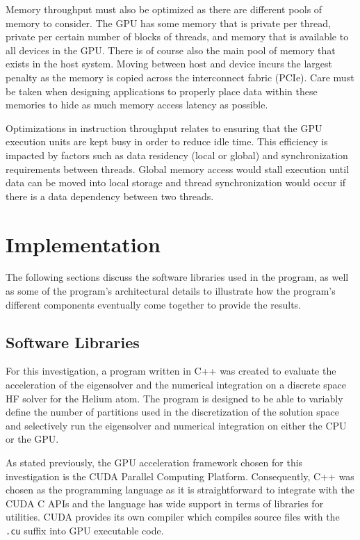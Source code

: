 \documentclass[conference, twoside]{IEEEtran}
\begin{document}
Memory throughput must also be optimized as there are different pools of memory to consider. The GPU has some memory that is private per thread, private per certain number of blocks of threads, and memory that is available to all devices in the GPU. There is of course also the main pool of memory that exists in the host system. Moving between host and device incurs the largest penalty as the memory is copied across the interconnect fabric (PCIe). Care must be taken when designing applications to properly place data within these memories to hide as much memory access latency as possible.

Optimizations in instruction throughput relates to ensuring that the GPU execution units are kept busy in order to reduce idle time. This efficiency is impacted by factors such as data residency (local or global) and synchronization requirements between threads. Global memory access would stall execution until data can be moved into local storage and thread synchronization would occur if there is a data dependency between two threads.

\section{Implementation} %

The following sections discuss the software libraries used in the program, as well as some of the program's architectural details to illustrate how the program's different components eventually come together to provide the results.

\subsection{Software Libraries} %

For this investigation, a program written in C++ was created to evaluate the acceleration of the eigensolver and the numerical integration on a discrete space HF solver for the Helium atom. The program is designed to be able to variably define the number of partitions used in the discretization of the solution space and selectively run the eigensolver and numerical integration on either the CPU or the GPU.

As stated previously, the GPU acceleration framework chosen for this investigation is the CUDA Parallel Computing Platform. Consequently, C++ was chosen as the programming language as it is straightforward to integrate with the CUDA C APIs and the language has wide support in terms of libraries for utilities. CUDA provides its own compiler which compiles source files with the \texttt{.cu} suffix into GPU executable code.
\end{document}
